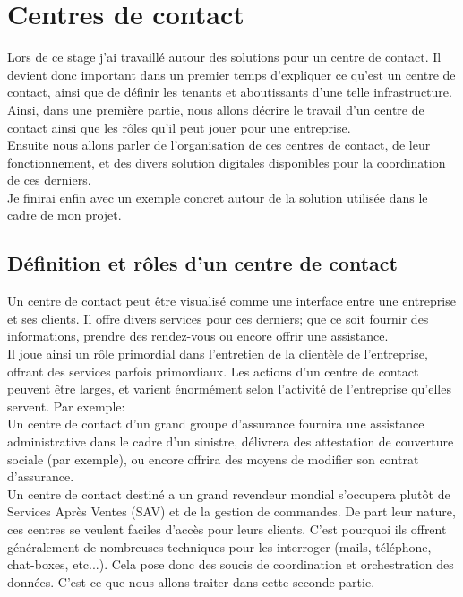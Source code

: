\documentclass{rapport}
\begin{document}
\newpage

\section{Centres de contact}

Lors de ce stage j'ai travaillé autour des solutions pour un centre de contact. Il devient donc important dans un premier temps d'expliquer ce qu'est un centre de contact, ainsi que de définir les tenants et aboutissants d'une telle infrastructure.\\
Ainsi, dans une première partie, nous allons décrire le travail d'un centre de contact ainsi que les rôles qu'il peut jouer pour une entreprise.\\
Ensuite nous allons parler de l'organisation de ces centres de contact, de leur fonctionnement, et des divers solution digitales disponibles pour la coordination de ces derniers.\\
Je finirai enfin avec un exemple concret autour de la solution utilisée dans le cadre de mon projet.

\subsection{Définition et rôles d'un centre de contact}

Un centre de contact peut être visualisé comme une interface entre une entreprise et ses clients. Il offre divers services pour ces derniers; que ce soit fournir des informations, prendre des rendez-vous ou encore offrir une assistance.\\

Il joue ainsi un rôle primordial dans l'entretien de la clientèle de l'entreprise, offrant des services parfois primordiaux.
Les actions d'un centre de contact peuvent être larges, et varient énormément selon l'activité de l'entreprise qu'elles servent. Par exemple:\\

Un centre de contact d'un grand groupe d'assurance fournira une assistance administrative dans le cadre d'un sinistre, délivrera des attestation de couverture sociale (par exemple), ou encore offrira des moyens de modifier son contrat d'assurance.\\

Un centre de contact destiné a un grand revendeur mondial s'occupera plutôt de Services Après Ventes (SAV) et de la gestion de commandes.
De part leur nature, ces centres se veulent faciles d'accès pour leurs clients. C'est pourquoi ils offrent généralement de nombreuses techniques pour les interroger (mails, téléphone, chat-boxes, etc...). Cela pose donc des soucis de coordination et orchestration des données.
C'est ce que nous allons traiter dans cette seconde partie.
\end{document}
